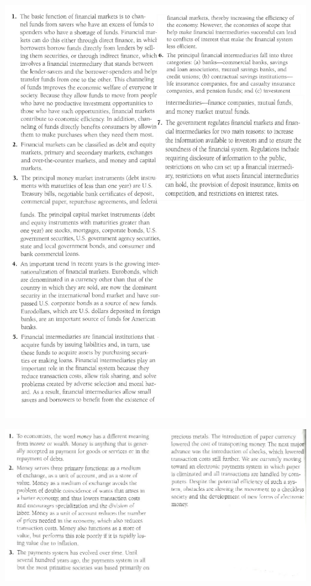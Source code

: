\documentclass[12pt]{examnotes}
\begin{document}
\obeylines  
\setlength\baselineskip{15pt}

\includegraphics[scale=0.3]{./imgs/2sum.jpg}

\includegraphics[scale=0.5]{./imgs/3sum.jpg}
\end{document}
